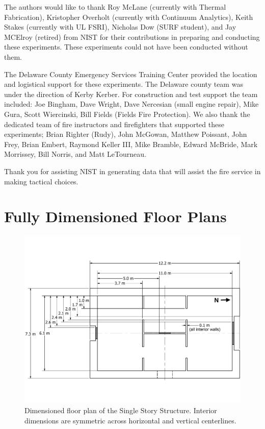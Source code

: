 \documentclass[12pt,oneside]{book}
\begin{document}
The authors would like to thank Roy McLane (currently with Thermal Fabrication), Kristopher Overholt (currently with Continuum Analytics), Keith Stakes (currently with UL FSRI), Nicholas Dow (SURF student), and Jay MCElroy (retired) from NIST for their contributions in preparing and conducting these experiments. These experiments could not have been conducted without them. 

The Delaware County Emergency Services Training Center provided the location and logistical support for these experiments.  The Delaware county team was under the direction of Kerby Kerber.  For construction and test support the team included: Joe Bingham, Dave Wright, Dave Nercesian (small engine repair), Mike Gura, Scott Wiercinski, Bill Fields (Fields Fire Protection).  We also thank the dedicated team of fire instructors and firefighters that supported these experiments; Brian Righter (Rudy), John McGowan, Matthew Poissant, John Frey, Brian Embert, Raymond Keller III, Mike Bramble, Edward McBride, Mark Morrissey, Bill Norris, and Matt LeTourneau.

Thank you for assisting NIST in generating data that will assist the fire service in making tactical choices.





\appendix
\chapter{Fully Dimensioned Floor Plans}
\label{chap:floor_plans}

\begin{figure}[!ht]
	\includegraphics[width=\columnwidth]{../Figures/Floor_Plans/East_Test_Structure_Dimensioned_Full}
	\caption[Dimensioned floor plan of the Single Story Structure.]{Dimensioned floor plan of the Single Story Structure. Interior dimensions are symmetric across horizontal and vertical centerlines.}
	\label{fig:east_dimensioned_plan}
\end{figure}
\end{document}

